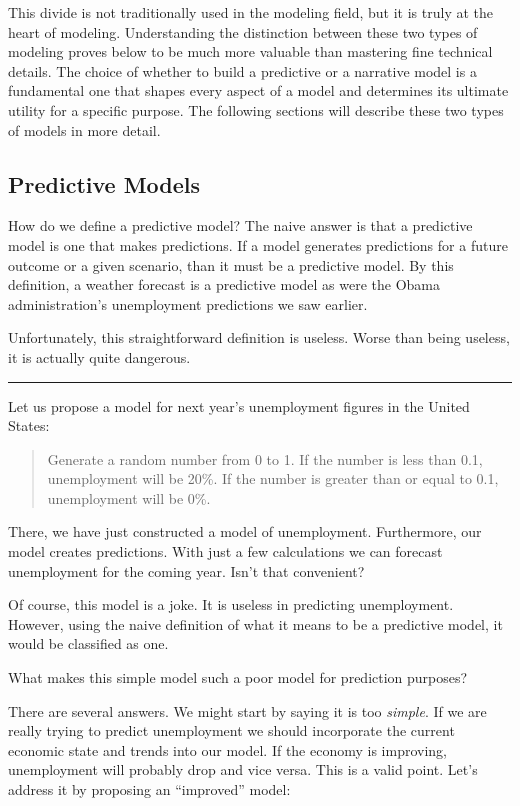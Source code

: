 \documentclass[]{memoir}
\begin{document}
This divide is not traditionally used in the modeling field, but it is
truly at the heart of modeling. Understanding the distinction between
these two types of modeling proves below to be much more valuable than
mastering fine technical details. The choice of whether to build a
predictive or a narrative model is a fundamental one that shapes every
aspect of a model and determines its ultimate utility for a specific
purpose. The following sections will describe these two types of models
in more detail.

\subsection{Predictive Models}

How do we define a predictive model? The naive answer is that a
predictive model is one that makes predictions. If a model generates
predictions for a future outcome or a given scenario, than it must be a
predictive model. By this definition, a weather forecast is a predictive
model as were the Obama administration's unemployment predictions we saw
earlier.

Unfortunately, this straightforward definition is useless. Worse than
being useless, it is actually quite dangerous.

\begin{center}\rule{3in}{0.4pt}\end{center}

Let us propose a model for next year's unemployment figures in the
United States:

\begin{quote}
Generate a random number from 0 to 1. If the number is less than 0.1,
unemployment will be 20\%. If the number is greater than or equal to
0.1, unemployment will be 0\%.
\end{quote}

There, we have just constructed a model of unemployment. Furthermore,
our model creates predictions. With just a few calculations we can
forecast unemployment for the coming year. Isn't that convenient?

Of course, this model is a joke. It is useless in predicting
unemployment. However, using the naive definition of what it means to be
a predictive model, it would be classified as one.

What makes this simple model such a poor model for prediction purposes?

There are several answers. We might start by saying it is too
\emph{simple}. If we are really trying to predict unemployment we should
incorporate the current economic state and trends into our model. If the
economy is improving, unemployment will probably drop and vice versa.
This is a valid point. Let's address it by proposing an ``improved''
model:
\end{document}
